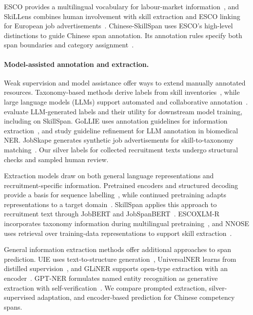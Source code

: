 ESCO provides a multilingual vocabulary for labour-market information~\citep{levrang2014esco,ESCOv1_2_2024}, and SkiLLens combines human involvement with skill extraction and ESCO linking for European job advertisements~\citep{desanto2026skilllens}. Chinese-SkillSpan uses ESCO's high-level distinctions to guide Chinese span annotation. Its annotation rules specify both span boundaries and category assignment~\citep{artstein2008agreement}.

\paragraph{Model-assisted annotation and extraction.} Weak supervision and model assistance offer ways to extend manually annotated resources. Taxonomy-based methods derive labels from skill inventories~\citep{zhang2022weak}, while large language models (LLMs) support automated and collaborative annotation~\citep{ding2023annotator,li2023coannotating}. \citet{ulhaq2026nerannotation} evaluate LLM-generated labels and their utility for downstream model training, including on SkillSpan. GoLLIE uses annotation guidelines for information extraction~\citep{gollie2024}, and \citet{kim2026guidelines} study guideline refinement for LLM annotation in biomedical NER. \mbox{JobSkape} generates synthetic job advertisements for skill-to-taxonomy matching~\citep{magron2024jobskape}. Our silver labels for collected recruitment texts undergo structural checks and sampled human review.

Extraction models draw on both general language representations and recruitment-specific information. Pretrained encoders and structured decoding provide a basis for sequence labelling~\citep{devlin2019bert,lafferty2001crf}, while continued pretraining adapts representations to a target domain~\citep{gururangan2020dapt}. SkillSpan applies this approach to recruitment text through JobBERT and JobSpanBERT~\citep{zhang2022skillspan}. ESCOXLM-R incorporates taxonomy information during multilingual pretraining~\citep{zhang2023escoxlmr}, and NNOSE uses retrieval over training-data representations to support skill extraction~\citep{zhang2024nnose}.

General information extraction methods offer additional approaches to span prediction. UIE uses text-to-structure generation~\citep{uie2022}, UniversalNER learns from distilled supervision~\citep{universalner}, and GLiNER supports open-type extraction with an encoder~\citep{gliner-naacl24}. GPT-NER formulates named entity recognition as generative extraction with self-verification~\citep{gptner2025}. We compare prompted extraction, silver-supervised adaptation, and encoder-based prediction for Chinese competency spans.

\FloatBarrier
